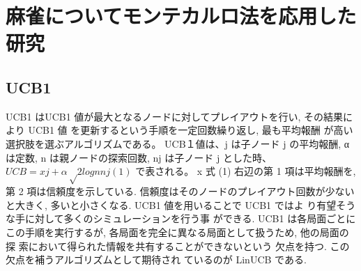 \section{麻雀についてモンテカルロ法を応用した研究}

\subsection{UCB1}
UCB1 はUCB1 値が最大となるノードに対してプレイアウトを行い, その結果により UCB1 値 を更新するという手順を一定回数繰り返し, 最も平均報酬 が高い選択肢を選ぶアルゴリズムである。
UCB１値は、j は子ノード j の平均報酬, α は定数, n は親ノードの探索回数, nj は子ノード j とした時、
$UCB=xj+α √2logn　nj (1)$ 
で表される。
x 式 (1) 右辺の第 1 項は平均報酬を, 第 2 項は信頼度を示している. 信頼度はそのノードのプレイアウト回数が少ないと大きく, 多いと小さくなる. UCB1 値を用いることで UCB1 ではよ り有望そうな手に対して多くのシミュレーションを行う事 ができる. UCB1 は各局面ごとにこの手順を実行するが, 各局面を完全に異なる局面として扱うため, 他の局面の探 索において得られた情報を共有することができないという 欠点を持つ. この欠点を補うアルゴリズムとして期待され ているのが LinUCB である.
